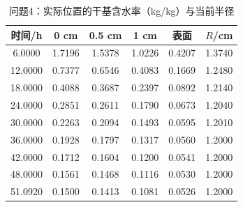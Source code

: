 \begin{table}[H]\centering
\caption{问题4：实际位置的干基含水率（kg/kg）与当前半径}\label{tab:q4}
\begin{tabular}{cccccc}\toprule
时间/h & 0 cm & 0.5 cm & 1 cm & 表面 & $R$/cm\\ \midrule
6.0000 & 1.7196 & 1.5378 & 1.0226 & 0.4207 & 1.3740\\
12.0000 & 0.7377 & 0.6546 & 0.4083 & 0.1669 & 1.2480\\
18.0000 & 0.4088 & 0.3687 & 0.2397 & 0.0892 & 1.2140\\
24.0000 & 0.2851 & 0.2611 & 0.1790 & 0.0673 & 1.2040\\
30.0000 & 0.2263 & 0.2094 & 0.1493 & 0.0595 & 1.2010\\
36.0000 & 0.1928 & 0.1797 & 0.1317 & 0.0560 & 1.2000\\
42.0000 & 0.1712 & 0.1604 & 0.1200 & 0.0541 & 1.2000\\
48.0000 & 0.1561 & 0.1468 & 0.1116 & 0.0530 & 1.2000\\
51.0920 & 0.1500 & 0.1413 & 0.1081 & 0.0526 & 1.2000\\
\bottomrule\end{tabular}\end{table}

